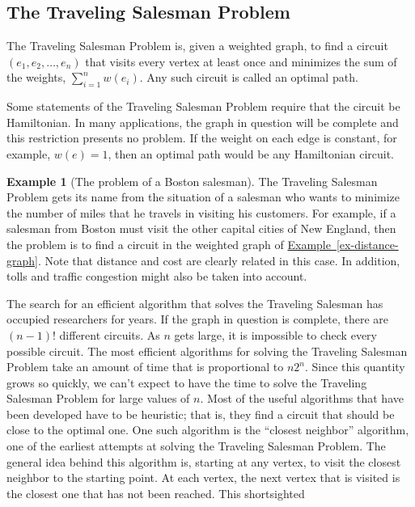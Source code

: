 \documentclass[10pt,]{book}
\theoremstyle{plain}
\theoremstyle{definition}
\theoremstyle{definition}
\theoremstyle{definition}
\newtheorem{example}[theorem]{Example}
\theoremstyle{definition}
\theoremstyle{definition}
\numberwithin{equation}{section}
\begin{document}
\subsection[The Traveling Salesman Problem]{The Traveling Salesman Problem}\label{ss-traveling-salesman-problem}
The Traveling Salesman Problem is, given a weighted graph, to find a circuit \(\left(e_1, e_2,\ldots ,e_n\right)\) that visits every vertex at least once and minimizes the sum of the weights, \(\sum_{i=1}^n w\left(e_i\right)\).  Any such circuit is called an  optimal path.%
\par
Some statements of the Traveling Salesman Problem require that the circuit be Hamiltonian. In many applications, the graph in question
will be complete and this restriction presents no problem.  If the weight on each edge is constant, for example, \(w(e) = 1\), then an optimal path would be any Hamiltonian circuit.%
\begin{example}[The problem of a Boston salesman]\label{ex-boston-salesman}
 The Traveling Salesman Problem gets its name from the situation of a salesman who wants to minimize the number of miles that
he travels in visiting his customers. For example, if a salesman from Boston must visit the other capital cities of New England, then the problem is to find a circuit in the weighted graph of \hyperref[ex-distance-graph]{Example~\ref{ex-distance-graph}}. Note that distance and cost are clearly related in this case. In addition, tolls and traffic congestion might also be taken into account. 
%
\end{example}
\par
The search for an efficient algorithm that solves the Traveling Salesman has occupied researchers for years. If the graph in question is complete,
there are \((n -1)!\) different circuits. As \(n\) gets large, it is impossible to check every possible circuit. The most efficient algorithms
for solving the Traveling Salesman Problem take an amount of time that is proportional to \(n 2^n\). Since this quantity grows so quickly, we can't
expect to have the time to solve the Traveling Salesman Problem for large values of \(n\). Most of the useful algorithms that have been developed
have to be heuristic; that is, they find a circuit that should be close to the optimal one. One such algorithm is the ``closest neighbor'' algorithm,
one of the earliest attempts at solving the Traveling Salesman Problem. The general idea behind this algorithm is, starting at any vertex, to visit
the closest neighbor to the starting point. At each vertex, the next vertex that is visited is the closest one that has not been reached. This shortsighted
\end{document}
